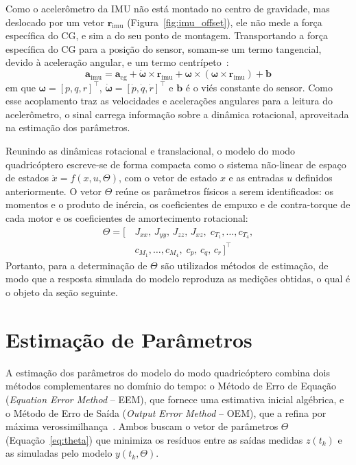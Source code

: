\documentclass{ieeeaccess}
\begin{document}
Como o acelerômetro da IMU não está montado no centro de gravidade, mas deslocado por um vetor $\mathbf{r}_{\mathrm{imu}}$ (Figura~\ref{fig:imu_offset}), ele não mede a força específica do CG, e sim a do seu ponto de montagem. Transportando a força específica do CG para a posição do sensor, somam-se um termo tangencial, devido à aceleração angular, e um termo centrípeto~\cite{c3}:
\begin{equation}
\mathbf{a}_{\mathrm{imu}} = \mathbf{a}_{\mathrm{cg}} + \dot{\boldsymbol{\omega}} \times \mathbf{r}_{\mathrm{imu}} + \boldsymbol{\omega} \times (\boldsymbol{\omega} \times \mathbf{r}_{\mathrm{imu}}) + \mathbf{b}
\label{eq:acc-imu}
\end{equation}
em que $\boldsymbol{\omega} = [p, q, r]^{\top}$, $\dot{\boldsymbol{\omega}} = [\dot{p}, \dot{q}, \dot{r}]^{\top}$ e $\mathbf{b}$ é o viés constante do sensor. Como esse acoplamento traz as velocidades e acelerações angulares para a leitura do acelerômetro, o sinal carrega informação sobre a dinâmica rotacional, aproveitada na estimação dos parâmetros.

Reunindo as dinâmicas rotacional e translacional, o modelo do modo quadricóptero escreve-se de forma compacta como o sistema não-linear de espaço de estados $\dot{x} = f(x, u, \Theta)$, com o vetor de estado $x$ e as entradas $u$ definidos anteriormente. O vetor $\Theta$ reúne os parâmetros físicos a serem identificados: os momentos e o produto de inércia, os coeficientes de empuxo e de contra-torque de cada motor e os coeficientes de amortecimento rotacional:
\begin{equation}
\begin{aligned}
\Theta = [\,&J_{xx},\,J_{yy},\,J_{zz},\,J_{xz},\;c_{T_1},\dots,c_{T_4},\\
&c_{M_1},\dots,c_{M_4},\;c_p,\,c_q,\,c_r\,]^{\top}
\end{aligned}
\label{eq:theta}
\end{equation}
Portanto, para a determinação de $\Theta$ são utilizados métodos de estimação, de modo que a resposta simulada do modelo reproduza as medições obtidas, o qual é o objeto da seção seguinte.

\section{Estimação de Parâmetros}
\label{sec:estimacao}

A estimação dos parâmetros do modelo do modo quadricóptero combina dois métodos complementares no domínio do tempo: o Método de Erro de Equação (\textit{Equation Error Method} -- EEM), que fornece uma estimativa inicial algébrica, e o Método de Erro de Saída (\textit{Output Error Method} -- OEM), que a refina por máxima verossimilhança~\cite{c2}. Ambos buscam o vetor de parâmetros $\Theta$ (Equação~\eqref{eq:theta}) que minimiza os resíduos entre as saídas medidas $z(t_k)$ e as simuladas pelo modelo $y(t_k,\Theta)$.
\end{document}
